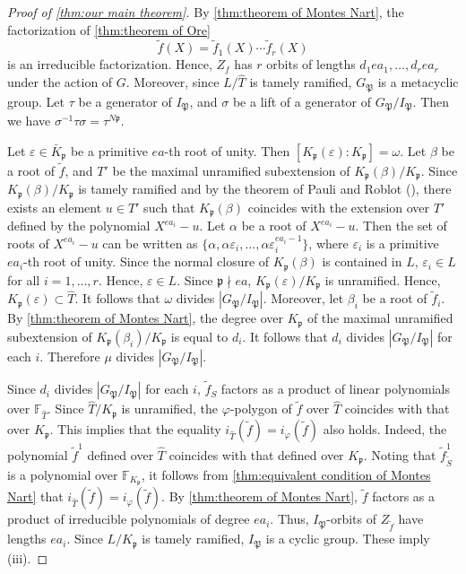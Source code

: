 \documentclass[10pt,a4paper]{amsart}
\newcommand{\field}[1]{\mathbb{#1}}
\numberwithin{equation}{section}
\begin{document}
\begin{proof}[Proof of \cref{thm:our main theorem}]
  By \cref{thm:theorem of Montes Nart}, the factorization of \cref{thm:theorem of Ore} 
  \[
    \tilde{f}(X) = \tilde{f}_1(X) \cdots \tilde{f}_r(X)
  \]
  is an irreducible factorization. Hence, $Z_f$ has $r$ orbits of lengths $d_1 ea_1, \dots ,d_r ea_r$ under the action of $G$. 
  Moreover, since $L/\hat{T}$ is tamely ramified, $G_{\mathfrak{P}}$ is a metacyclic group. 
  Let $\tau$ be a generator of $I_{\mathfrak{P}}$, and $\sigma$ be a lift of a generator of $G_{\mathfrak{P}}/I_{\mathfrak{P}}$. 
  Then we have $\sigma^{-1}\tau\sigma = \tau^{N\mathfrak{p}}$. 

  Let $\varepsilon \in \bar{K}_{\mathfrak{p}}$ be a primitive $ea$-th root of unity. 
  Then $[K_{\mathfrak{p}}(\varepsilon):K_{\mathfrak{p}}] = \omega$. 
  Let $\beta$ be a root of $\tilde{f}$, and $T'$ be the maximal unramified subextension of $K_{\mathfrak{p}}(\beta)/K_{\mathfrak{p}}$. 
  Since $K_{\mathfrak{p}}(\beta)/K_{\mathfrak{p}}$ is tamely ramified and by the theorem of Pauli and Roblot (\cite[Theorem 7.2]{MR1836924}), 
  there exists an element $u \in T'$ such that $K_{\mathfrak{p}}(\beta)$ coincides with the extension over $T'$ defined by the polynomial $X^{ea_i} - u$. 
  Let $\alpha$ be a root of $X^{ea_i} - u$. Then the set of roots of $X^{ea_i} - u$ can be written as $\{\alpha,\alpha\varepsilon_i,\dots,\alpha\varepsilon_i^{ea_i-1}\}$, 
  where $\varepsilon_i$ is a primitive $ea_i$-th root of unity. 
  Since the normal closure of $K_{\mathfrak{p}}(\beta)$ is contained in $L$, $\varepsilon_i \in L$ for all $i=1, \dots ,r$. 
  Hence, $\varepsilon \in L$. 
  Since $\mathfrak{p} \nmid ea$, $K_{\mathfrak{p}}(\varepsilon)/K_{\mathfrak{p}}$ is unramified. Hence, $K_{\mathfrak{p}}(\varepsilon) \subset \hat{T}$. 
  It follows that $\omega$ divides $|G_{\mathfrak{P}}/I_{\mathfrak{P}}|$. 
  Moreover, let $\beta_i$ be a root of $\tilde{f}_i$. 
  By \cref{thm:theorem of Montes Nart}, the degree over $K_{\mathfrak{p}}$ of the maximal unramified subextension of $K_{\mathfrak{p}}(\beta_i)/K_{\mathfrak{p}}$ 
  is equal to $d_i$. It follows that $d_i$ divides $|G_{\mathfrak{P}}/I_{\mathfrak{P}}|$ for each $i$. 
  Therefore $\mu$ divides $|G_{\mathfrak{P}}/I_{\mathfrak{P}}|$. 

  Since $d_i$ divides $|G_{\mathfrak{P}}/I_{\mathfrak{P}}|$ for each $i$, $\tilde{f}_S$ factors as a product of linear polynomials over $\field{F}_{\hat{T}}$. 
  Since $\hat{T}/K_{\mathfrak{p}}$ is unramified, the $\varphi$-polygon of $\tilde{f}$ over $\hat{T}$ coincides with that over $K_{\mathfrak{p}}$. 
  This implies that the equality $i_{\hat{T}}(\tilde{f}) = i_{\varphi}(\tilde{f})$ also holds. 
  Indeed, the polynomial $\tilde{f}^1$ defined over $\hat{T}$ coincides with that defined over $K_{\mathfrak{p}}$. 
  Noting that $\tilde{f}^1_{\tilde{S}}$ is a polynomial over $\field{F}_{K_{\mathfrak{p}}}$, it follows from \cref{thm:equivalent condition of Montes Nart} that 
  $i_{\hat{T}}(\tilde{f}) = i_{\varphi}(\tilde{f})$. 
  By \cref{thm:theorem of Montes Nart}, $\tilde{f}$ factors as a product of irreducible polynomials of degree $ea_i$. 
  Thus, $I_{\mathfrak{P}}$-orbits of $Z_{\tilde{f}}$ have lengths $ea_i$. 
  Since $L/K_{\mathfrak{p}}$ is tamely ramified, $I_{\mathfrak{P}}$ is a cyclic group. 
  These imply (iii). 


\end{proof}
\end{document}
